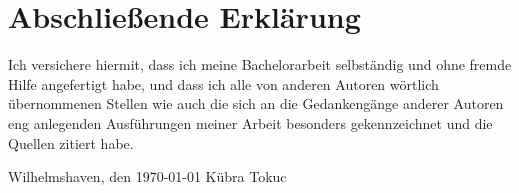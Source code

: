 
\newpage
\section*{Abschließende Erklärung} 

Ich versichere hiermit, dass ich meine Bachelorarbeit selbständig und ohne fremde Hilfe angefertigt habe, und dass ich alle von anderen Autoren wörtlich übernommenen Stellen wie auch die sich an die Gedankengänge anderer Autoren eng anlegenden Ausführungen meiner Arbeit besonders gekennzeichnet und die Quellen zitiert habe.

\vspace*{3cm}
\noindent Wilhelmshaven, den \today \hspace*{2cm} Kübra Tokuc
